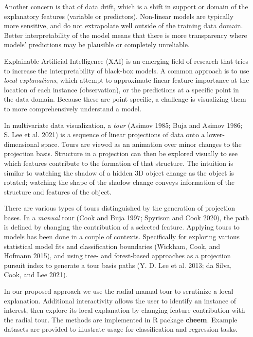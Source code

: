 \documentclass[
]{article}
\begin{document}
Another concern is that of data drift, which is a shift in support or domain of the explanatory features (variable or predictors). Non-linear models are typically more sensitive, and do not extrapolate well outside of the training data domain. Better interpretability of the model means that there is more transparency where models' predictions may be plausible or completely unreliable.

Explainable Artificial Intelligence (XAI) is an emerging field of research that tries to increase the interpretability of black-box models. A common approach is to use \emph{local explanations}, which attempt to approximate linear feature importance at the location of each instance (observation), or the predictions at a specific point in the data domain. Because these are point specific, a challenge is visualizing them to more comprehensively understand a model.

In multivariate data visualization, a \emph{tour} (Asimov 1985; Buja and Asimov 1986; S. Lee et al. 2021) is a sequence of linear projections of data onto a lower-dimensional space. Tours are viewed as an animation over minor changes to the projection basis. Structure in a projection can then be explored visually to see which features contribute to the formation of that structure. The intuition is similar to watching the shadow of a hidden 3D object change as the object is rotated; watching the shape of the shadow change conveys information of the structure and features of the object.

There are various types of tours distinguished by the generation of projection bases. In a \emph{manual} tour (Cook and Buja 1997; Spyrison and Cook 2020), the path is defined by changing the contribution of a selected feature. Applying tours to models has been done in a couple of contexts. Specifically for exploring various statistical model fits and classification boundaries (Wickham, Cook, and Hofmann 2015), and using tree- and forest-based approaches as a projection pursuit index to generate a tour basis paths (Y. D. Lee et al. 2013; da Silva, Cook, and Lee 2021).

In our proposed approach we use the radial manual tour to scrutinize a local explanation. Additional interactivity allows the user to identify an instance of interest, then explore its local explanation by changing feature contribution with the radial tour. The methods are implemented in R package \textbf{cheem}. Example datasets are provided to illustrate usage for classification and regression tasks.
\end{document}
